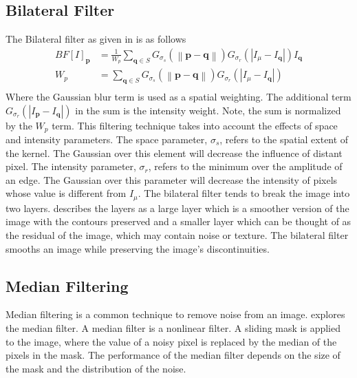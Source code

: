 \documentclass{article}
\newcommand{\norm}[1]{\left\| #1 \right\|}
\begin{document}
\subsection{Bilateral Filter}
\label{subsec:bilateral-filter}
The Bilateral filter as given in \cite{Faisal-bilateral} is as follows
%
\begin{align*}
  BF[I]_{\textbf{p}}&= \displaystyle \frac{1}{W_p} \sum_{\textbf{q} \in S} G_{\sigma_s} \left(\norm{\textbf{p} - \textbf{q}}\right)
  G_{\sigma_r} \left(|I_{\textbf{\(\mu\)}} - I_{\textbf{q}}|\right)I_{\textbf{q}} \\
  W_p &= \sum_{\textbf{q} \in S} G_{\sigma_s} \left(\norm{\textbf{p} - \textbf{q}}\right)
        G_{\sigma_r} \left(|I_{\textbf{\(\mu\)}} - I_{\textbf{q}}|\right) \\
\end{align*}
%
Where the Gaussian blur term is used as a spatial weighting. The
additional term
\(G_{\sigma_r} \left(|I_{\textbf{p}} - I_{\textbf{q}}|\right)\) in the
sum is the intensity weight. Note, the sum is normalized by the
\(W_p\) term. This filtering technique takes into account the effects
of space and intensity parameters. The space parameter, $\sigma_s$,
refers to the spatial extent of the kernel. The Gaussian over this
element will decrease the influence of distant pixel. The intensity
parameter, $\sigma_r$, refers to the minimum over the amplitude of an
edge. The Gaussian over this parameter will decrease the intensity of
pixels whose value is different from $I_{\textbf{\(\mu\)}}$. The
bilateral filter tends to break the image into two
layers. \cite{bilateral} describes the layers as a large layer which
is a smoother version of the image with the contours preserved and a
smaller layer which can be thought of as the residual of the image,
which may contain noise or texture. The bilateral filter smooths an
image while preserving the image's discontinuities.
%
\subsection{Median Filtering}
\label{subsec:median-filter}
%
Median filtering is a common technique to remove noise from an
image. \cite{Med2012} explores the median filter. A median filter is a
nonlinear filter. A sliding mask is applied to the image, where the
value of a noisy pixel is replaced by the median of the pixels in
the mask. The performance of the median filter depends on the size
of the mask and the distribution of the noise.
\end{document}
